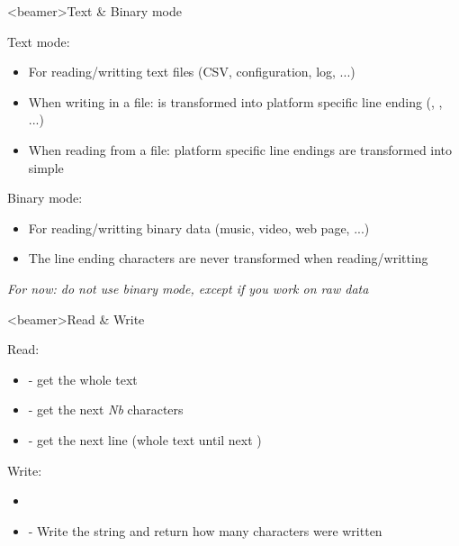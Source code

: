 \begin{frame}<beamer>{Text \& Binary mode}

   Text mode:  

  \begin{itemize}
    \item<3-> For reading/writting text files (CSV, configuration, log, ...)
    \item<4-> When writing in a file:  is transformed into platform specific line ending (, , ...)
    \item<5-> When reading from a file: platform specific line endings are transformed into simple 
  \end{itemize}

  \bigskip

   Binary mode:  

  \begin{itemize}
    \item<8-> For reading/writting binary data (music, video, web page, ...)
    \item<9-> The line ending characters are never transformed when reading/writting
  \end{itemize}

  \bigskip

   \textit{For now: do not use binary mode, except if you work on raw data}

\end{frame}


\begin{frame}<beamer>{Read \& Write}

  Read:

  \begin{itemize}
    \item<1->  - get the whole text
    \item<2->  - get the next \textit{Nb} characters
    \item<3->  - get the next line (whole text until next )
  \end{itemize}

  \bigskip

   Write:

  \begin{itemize}
    \item<5-> 
    \item<6->  - Write the string and return how many characters were written
  \end{itemize}

\end{frame}

